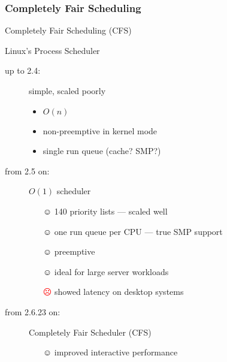 \subsubsection{Completely Fair Scheduling}
\label{sec:compl-fair-sched}

\begin{frame}{Completely Fair Scheduling (CFS)}
  \begin{block}{Linux's Process Scheduler}
    \begin{description}
    \item[up to 2.4:] simple, scaled poorly
      \begin{multicols}{2}
        \begin{itemize}
        \item $O(n)$
        \item non-preemptive in kernel mode
        \item single run queue (cache? SMP?)
        \end{itemize}
      \end{multicols}
    \item[from 2.5 on:] $O(1)$ scheduler
      \begin{itemize}
      \item[☺] 140 priority lists --- scaled well
      \item[☺] one run queue per CPU --- true SMP support
      \item[☺] preemptive
      \item[☺] ideal for large server workloads
      \item[\textcolor{red}{☹}] showed latency on desktop systems
      \end{itemize}
    \item[from 2.6.23 on:] Completely Fair Scheduler (CFS)
      \begin{itemize}
      \item[☺] improved interactive performance
      \end{itemize}
    \end{description}
  \end{block}
\end{frame}


